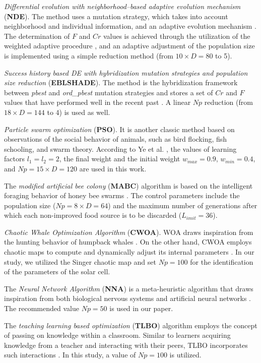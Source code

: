 \documentclass[a4paper,fleqn]{cas-sc}
\begin{document}
\emph{Differential evolution with neighborhood--based adaptive evolution mechanism} (\textbf{NDE}).
The method uses a mutation strategy, which takes into account neighborhood and individual information, and an adaptive evolution mechanism \cite{NDE}.
The determination of $F$ and $C\!r$ values is achieved through the utilization of the weighted adaptive procedure \cite{Tanabe2014},
and an adaptive adjustment of the population size is implemented using a simple reduction method (from $10\times D=80$ to 5).

\emph{Success history based DE with hybridization mutation strategies and population size reduction} (\textbf{EBLSHADE}).
The method is the hybridization framework between \emph{pbest} and \emph{ord\_pbest} mutation strategies
and stores a set of $Cr$ and $F$ values that have performed well in the recent past \cite{EBLSHADE}.
A linear $N\!p$ reduction (from $18\times D=144$ to 4) is used as well.

\emph{Particle swarm optimization} (\textbf{PSO}).
It is another classic method based on observations of the social behavior of animals,
such as bird flocking, fish schooling, and swarm theory.
According to Ye et al. \cite{PSO},  the values of learning factors $l_1=l_2=2$,
the final weight and the initial weight $w_{max}=0.9$, $w_{min}=0.4$, and
$N\!p=15\times D=120$ are used in this work.

The \emph{modified artificial bee colony} (\textbf{MABC}) algorithm is based
on the intelligent foraging behavior of honey bee swarms \cite{MABC}.
The control parameters include the population size ($N\!p=8\times D=64$)
and the maximum number of generations after which each non-improved food source is to be discarded ($L_{imit}=36$).

\emph{Chaotic Whale Optimization Algorithm} (\textbf{CWOA}).
WOA draws inspiration from the hunting behavior of humpback whales \cite{WOA}.
On the other hand, CWOA employs chaotic maps to compute and dynamically adjust its internal parameters \cite{CWOA}.
In our study, we utilized the Singer chaotic map and set $N\!p=100$ for the identification of the parameters of the solar cell.

The \emph{Neural Network Algorithm} (\textbf{NNA}) is a meta-heuristic algorithm that draws inspiration from
both biological nervous systems and artificial neural networks \cite{NNA}.
The recommended \cite{NNA} value $N\!p=50$ is used in our paper.

The \emph{teaching learning based optimization} (\textbf{TLBO}) algorithm employs the concept of passing on knowledge
within a classroom.
Similar to learners acquiring knowledge from a teacher and interacting with their peers,
TLBO incorporates such interactions \cite{TLBO_Patel}.
In this study, a value of $N\!p=100$ is utilized.
\end{document}
